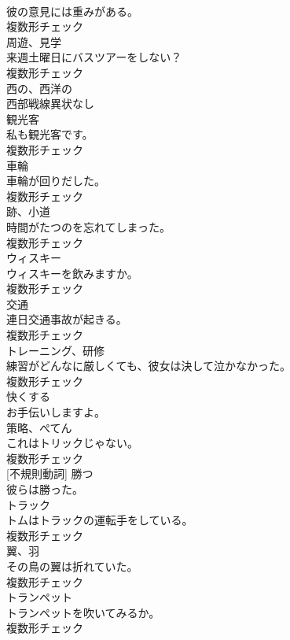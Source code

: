 \documentclass[8pt]{extreport}
\begin{document}
\begin{CJK}{UTF8}{min}
\\	彼の意見には重みがある。	
\\	複数形チェック
\\	[名詞]	周遊、見学	
\\	来週土曜日にバスツアーをしない？	
\\	複数形チェック
\\	[形容詞]	⻄の、⻄洋の	
\\	西部戦線異状なし	
\\	[名詞]	観光客	
\\	私も観光客です。	
\\	複数形チェック
\\	[名詞]	車輪	
\\	車輪が回りだした。	
\\	複数形チェック
\\	[名詞]	跡、小道	
\\	時間がたつのを忘れてしまった。	
\\	複数形チェック
\\	[名詞]	ウィスキー	
\\	ウィスキーを飲みますか。	
\\	複数形チェック
\\	[名詞]	交通	
\\	連日交通事故が起きる。	
\\	複数形チェック
\\	[名詞]	トレーニング、研修	
\\	練習がどんなに厳しくても、彼女は決して泣かなかった。	
\\	複数形チェック
\\	[形容詞]	快くする	
\\	お手伝いしますよ。	
\\	[名詞]	策略、ぺてん	
\\	これはトリックじゃない。	
\\	複数形チェック
\\	[動詞] [不規則動詞]	勝つ	
\\	彼らは勝った。	
\\	[名詞]	トラック	
\\	トムはトラックの運転手をしている。	
\\	複数形チェック
\\	[名詞]	翼、羽	
\\	その鳥の翼は折れていた。	
\\	複数形チェック
\\	[名詞]	トランペット	
\\	トランペットを吹いてみるか。	
\\	複数形チェック

\end{CJK}
\end{document}
